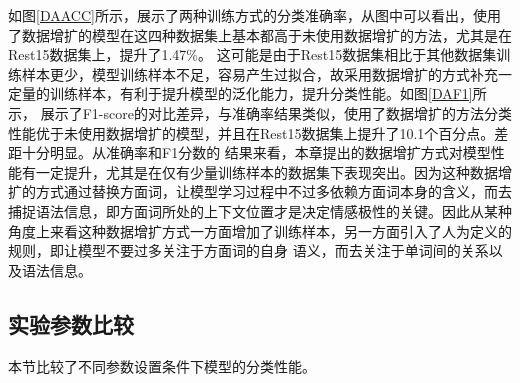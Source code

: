 如图\ref{DAACC}所示，展示了两种训练方式的分类准确率，从图中可以看出，使用了数据增扩的模型在这四种数据集上基本都高于未使用数据增扩的方法，尤其是在Rest15数据集上，提升了1.47\%。
这可能是由于Rest15数据集相比于其他数据集训练样本更少，模型训练样本不足，容易产生过拟合，故采用数据增扩的方式补充一定量的训练样本，有利于提升模型的泛化能力，提升分类性能。如图\ref{DAF1}所示，
展示了F1-score的对比差异，与准确率结果类似，使用了数据增扩的方法分类性能优于未使用数据增扩的模型，并且在Rest15数据集上提升了10.1个百分点。差距十分明显。从准确率和F1分数的
结果来看，本章提出的数据增扩方式对模型性能有一定提升，尤其是在仅有少量训练样本的数据集下表现突出。因为这种数据增扩的方式通过替换方面词，让模型学习过程中不过多依赖方面词本身的含义，而去
捕捉语法信息，即方面词所处的上下文位置才是决定情感极性的关键。因此从某种角度上来看这种数据增扩方式一方面增加了训练样本，另一方面引入了人为定义的规则，即让模型不要过多关注于方面词的自身
语义，而去关注于单词间的关系以及语法信息。

\subsection{实验参数比较}
本节比较了不同参数设置条件下模型的分类性能。
